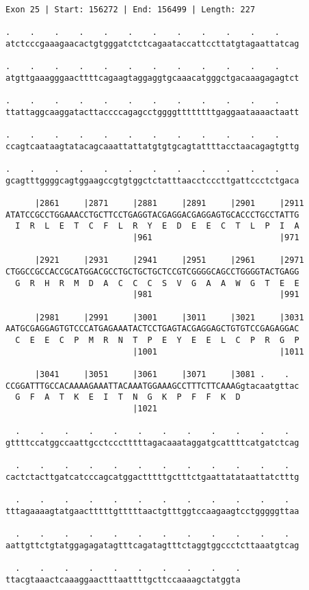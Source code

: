 \documentclass{article}
\begin{document}
\begin{Verbatim}
Exon 25 | Start: 156272 | End: 156499 | Length: 227
 
.    .    .    .    .    .    .    .    .    .    .    .    
atctcccgaaagaacactgtgggatctctcagaataccattccttatgtagaattatcag
  
.    .    .    .    .    .    .    .    .    .    .    .    
atgttgaaagggaacttttcagaagtaggaggtgcaaacatgggctgacaaagagagtct
  
.    .    .    .    .    .    .    .    .    .    .    .    
ttattaggcaaggatacttaccccagagcctggggttttttttgaggaataaaactaatt
  
.    .    .    .    .    .    .    .    .    .    .    .    
ccagtcaataagtatacagcaaattattatgtgtgcagtattttacctaacagagtgttg
  
.    .    .    .    .    .    .    .    .    .    .    .    
gcagtttggggcagtggaagccgtgtggctctatttaacctcccttgattccctctgaca
  
      |2861     |2871     |2881     |2891     |2901     |2911
ATATCCGCCTGGAAACCTGCTTCCTGAGGTACGAGGACGAGGAGTGCACCCTGCCTATTG
  I  R  L  E  T  C  F  L  R  Y  E  D  E  E  C  T  L  P  I  A
                          |961                          |971
  
      |2921     |2931     |2941     |2951     |2961     |2971
CTGGCCGCCACCGCATGGACGCCTGCTGCTGCTCCGTCGGGGCAGCCTGGGGTACTGAGG
  G  R  H  R  M  D  A  C  C  C  S  V  G  A  A  W  G  T  E  E
                          |981                          |991
  
      |2981     |2991     |3001     |3011     |3021     |3031
AATGCGAGGAGTGTCCCATGAGAAATACTCCTGAGTACGAGGAGCTGTGTCCGAGAGGAC
  C  E  E  C  P  M  R  N  T  P  E  Y  E  E  L  C  P  R  G  P
                          |1001                         |1011
  
      |3041     |3051     |3061     |3071     |3081 .    .  
CCGGATTTGCCACAAAAGAAATTACAAATGGAAAGCCTTTCTTCAAAGgtacaatgttac
  G  F  A  T  K  E  I  T  N  G  K  P  F  F  K  D            
                          |1021                             
  
  .    .    .    .    .    .    .    .    .    .    .    .  
gttttccatggccaattgcctccctttttagacaaataggatgcattttcatgatctcag
  
  .    .    .    .    .    .    .    .    .    .    .    .  
cactctacttgatcatcccagcatggactttttgctttctgaattatataattatctttg
  
  .    .    .    .    .    .    .    .    .    .    .    .  
tttagaaaagtatgaactttttgtttttaactgtttggtccaagaagtcctgggggttaa
  
  .    .    .    .    .    .    .    .    .    .    .    .  
aattgttctgtatggagagatagtttcagatagtttctaggtggccctcttaaatgtcag
  
  .    .    .    .    .    .    .    .    .    .
ttacgtaaactcaaaggaactttaattttgcttccaaaagctatggta
\end{Verbatim}
\end{document}

